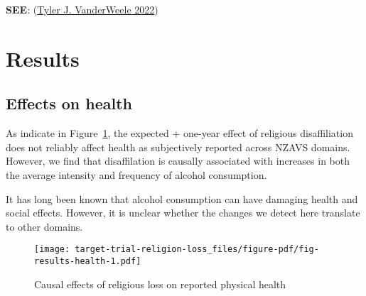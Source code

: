 \documentclass[
  singlecolumn]{report}
\begin{document}
\textbf{SEE}: (\protect\hyperlink{ref-vanderweele2022}{Tyler J.
VanderWeele 2022})

\hypertarget{results}{%
\section{Results}\label{results}}

\hypertarget{effects-on-health}{%
\subsection{Effects on health}\label{effects-on-health}}

As indicate in Figure~\ref{fig-results-health}, the expected + one-year
effect of religious disaffiliation does not reliably affect health as
subjectively reported across NZAVS domains. However, we find that
disaffilation is causally associated with increases in both the average
intensity and frequency of alcohol consumption.

It has long been known that alcohol consumption can have damaging health
and social effects. However, it is unclear whether the changes we detect
here translate to other domains.

\begin{figure}

{\centering \texttt{[image: target-trial-religion-loss\_files/figure-pdf/fig-results-health-1.pdf]}

}

\caption{\label{fig-results-health}Causal effects of religious loss on
reported physical health}

\end{figure}
\end{document}
